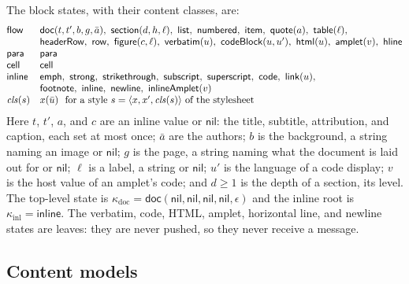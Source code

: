 \documentclass[11pt]{article}
\numberwithin{equation}{section}
\newcommand{\kw}[1]{\ensuremath{\mathsf{#1}}}
\begin{document}
The block states, with their content classes, are:
\begin{equation}\label{eq:lib-states}
\begin{array}{@{}ll@{}}
\kw{flow} & \kw{doc}(t, t', b, g, \bar a),\ \kw{section}(d, h, \ell),\
  \kw{list},\ \kw{numbered},\ \kw{item},\ \kw{quote}(a),\ \kw{table}(\ell), \\
  & \kw{headerRow},\ \kw{row},\ \kw{figure}(c, \ell),\
  \kw{verbatim}(u),\ \kw{codeBlock}(u, u'),\ \kw{html}(u),\
  \kw{amplet}(v),\ \kw{hline} \\
\kw{para} & \kw{para} \\
\kw{cell} & \kw{cell} \\
\kw{inline} & \kw{emph},\ \kw{strong},\
  \kw{strikethrough},\ \kw{subscript},\ \kw{superscript},\ \kw{code},\
  \kw{link}(u), \\
  & \kw{footnote},\ \kw{inline},\ \kw{newline},\ \kw{inlineAmplet}(v) \\
\mathit{cls}(s) & x(\bar u)\ \text{ for a style } s = \langle x, x', \mathit{cls}(s)\rangle
  \text{ of the stylesheet}
\end{array}
\end{equation}
Here $t$, $t'$, $a$, and $c$ are an inline value or $\kw{nil}$: the title,
subtitle, attribution, and caption, each set at most once; $\bar a$ are the
authors; $b$ is the background, a string naming an image or $\kw{nil}$;
$g$ is the page, a string naming what the document is laid out for or
$\kw{nil}$;
$\ell$ is a label, a string or $\kw{nil}$; $u'$ is the language of
a code display; $v$ is the host value of an amplet's code; and $d \ge 1$ is the
depth of a section, its level.  The top-level state is
$\kappa_{\mathrm{doc}} = \kw{doc}(\kw{nil}, \kw{nil}, \kw{nil}, \kw{nil}, \epsilon)$ and the
inline root is $\kappa_{\mathrm{inl}} = \kw{inline}$.  The verbatim, code,
HTML, amplet, horizontal line, and newline states are leaves: they are never pushed, so they
never receive a message.

\subsection{Content models}
\end{document}
